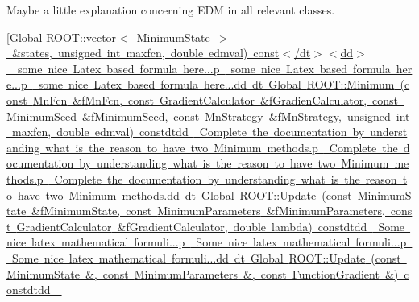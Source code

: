 \begin{DoxyRefList}
\label{todo__todo000029}%
%
Maybe a little explanation concerning E\+DM in all relevant classes. 
\item[Global \mbox{\hyperlink{classROOT_1_1Minuit2_1_1FumiliBuilder_ac0df0ebc275b75e6a6831f102f1753d2}{R\+O\+OT\+:\+:vector$<$ Minimum\+State $>$ \&states, unsigned int maxfcn, double edmval) const$<$/dt$>$$<$dd$>$ \label{todo__todo000004}%
%
some nice Latex based formula here...p \label{todo__todo000016}%
%
some nice Latex based formula here...p \label{todo__todo000028}%
%
some nice Latex based formula here...dd dt Global \mbox{\hyperlink{classROOT_1_1Minuit2_1_1FumiliBuilder_a6e598ea8d57750ec860595ba494bb501}{R\+O\+OT\+:\+:Minimum}} (const \mbox{\hyperlink{classROOT_1_1Minuit2_1_1MnFcn}{Mn\+Fcn}} \&f\+Mn\+Fcn, const \mbox{\hyperlink{classROOT_1_1Minuit2_1_1GradientCalculator}{Gradient\+Calculator}} \&f\+Gradien\+Calculator, const \mbox{\hyperlink{classROOT_1_1Minuit2_1_1MinimumSeed}{Minimum\+Seed}} \&f\+Minimum\+Seed, const \mbox{\hyperlink{classROOT_1_1Minuit2_1_1MnStrategy}{Mn\+Strategy}} \&f\+Mn\+Strategy, unsigned int maxfcn, double edmval) constdtdd \label{todo__todo000003}%
%
Complete the documentation by understanding what is the reason to have two Minimum methods.p \label{todo__todo000015}%
%
Complete the documentation by understanding what is the reason to have two Minimum methods.p \label{todo__todo000027}%
%
Complete the documentation by understanding what is the reason to have two Minimum methods.dd dt Global \mbox{\hyperlink{classROOT_1_1Minuit2_1_1FumiliErrorUpdator_a56adeed7f507548e61a3563182f3caaf}{R\+O\+OT\+:\+:Update}} (const \mbox{\hyperlink{classROOT_1_1Minuit2_1_1MinimumState}{Minimum\+State}} \&f\+Minimum\+State, const \mbox{\hyperlink{classROOT_1_1Minuit2_1_1MinimumParameters}{Minimum\+Parameters}} \&f\+Minimum\+Parameters, const \mbox{\hyperlink{classROOT_1_1Minuit2_1_1GradientCalculator}{Gradient\+Calculator}} \&f\+Gradient\+Calculator, double lambda) constdtdd \label{todo__todo000006}%
%
Some nice latex mathematical formuli...p \label{todo__todo000018}%
%
Some nice latex mathematical formuli...p \label{todo__todo000030}%
%
Some nice latex mathematical formuli...dd dt Global \mbox{\hyperlink{classROOT_1_1Minuit2_1_1FumiliErrorUpdator_ae5ee7f2052c474169dd19ffbc3755bd3}{R\+O\+OT\+:\+:Update}} (const \mbox{\hyperlink{classROOT_1_1Minuit2_1_1MinimumState}{Minimum\+State}} \&, const \mbox{\hyperlink{classROOT_1_1Minuit2_1_1MinimumParameters}{Minimum\+Parameters}} \&, const \mbox{\hyperlink{classROOT_1_1Minuit2_1_1FunctionGradient}{Function\+Gradient}} \&) constdtdd \label{todo__todo000007}%
$$}}
\end{DoxyRefList}
